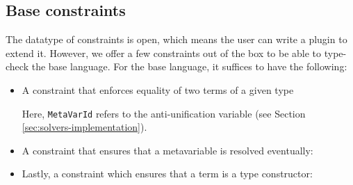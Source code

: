 \hypertarget{base-constraints}{%
\subsection{Base constraints}\label{base-constraints}}

The datatype of constraints is open, which means the user can write a
plugin to extend it. However, we offer a few constraints out of the box
to be able to type-check the base language. For the base language, it
suffices to have the following:

\begin{itemize}
\item
  A constraint that enforces equality of two terms of a given type


\begin{imageonly}
\begin{Shaded}
\begin{Highlighting}[]
 \OtherTok{=}
         
\end{Highlighting}
\end{Shaded}
\end{imageonly}

  Here, \texttt{MetaVarId} refers to the anti-unification variable (see
  Section \ref{sec:solvers-implementation}).
\item
  A constraint that ensures that a metavariable is resolved eventually:

\begin{imageonly}
\begin{Shaded}
\begin{Highlighting}[]
 \OtherTok{=}
      \NormalTok{ (} \NormalTok{)}
\end{Highlighting}
\end{Shaded}
\end{imageonly}
\item
  Lastly, a constraint which ensures that a term is a type constructor:

\begin{imageonly}
\begin{Shaded}
\begin{Highlighting}[]
 \OtherTok{=}
      
\end{Highlighting}
\end{Shaded}
\end{imageonly}
\end{itemize}

